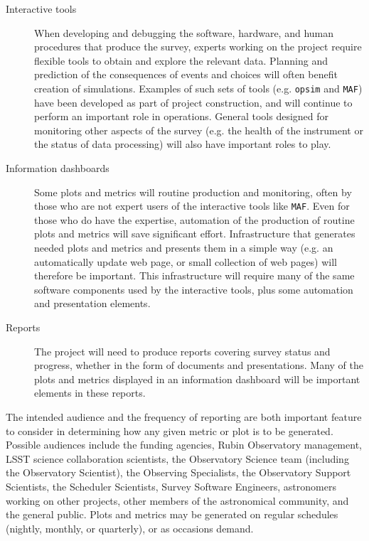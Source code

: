 \begin{description}
\item[{Interactive tools}] When developing and debugging the software, hardware, and human procedures that produce the survey, experts working on the project require flexible tools to obtain and explore the relevant data. Planning and prediction of the consequences of events and choices will often benefit creation of simulations. Examples of such sets of tools (e.g. \texttt{opsim} and \texttt{MAF}) have been developed as part of project construction, and will continue to perform an important role in operations. General tools designed for monitoring other aspects of the survey (e.g. the health of the instrument or the status of data processing) will also have important roles to play.
\item[{Information dashboards}] Some plots and metrics will routine production and monitoring, often by those who are not expert users of the interactive tools like \texttt{MAF}. Even for those who do have the expertise, automation of the production of routine plots and metrics will save significant effort. Infrastructure that generates needed plots and metrics and presents them in a simple way (e.g. an automatically update web page, or small collection of web pages) will therefore be important. This infrastructure will require many of the same software components used by the interactive tools, plus some automation and presentation elements.
\item[{Reports}] The project will need to produce reports covering survey status and progress, whether in the form of documents and presentations. Many of the plots and metrics displayed in an information dashboard will be important elements in these reports.
\end{description}

The intended audience and the frequency of reporting are both important feature to consider in determining how any given metric or plot is to be generated.
Possible audiences include the funding agencies, Rubin Observatory management, LSST science collaboration scientists, the Observatory Science team (including the Observatory Scientist), the Observing Specialists, the Observatory Support Scientists, the Scheduler Scientists, Survey Software Engineers, astronomers working on other projects, other members of the astronomical community, and the general public. 
Plots and metrics may be generated on regular schedules (nightly, monthly, or quarterly), or as occasions demand.


